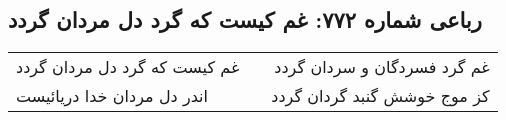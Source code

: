 \begin{center}
\section*{رباعی شماره ۷۷۲: غم کیست که گرد دل مردان گردد}
\label{sec:0772}
\begin{longtable}{l p{0.5cm} r}
غم کیست که گرد دل مردان گردد
&&
غم گرد فسردگان و سردان گردد
\\
اندر دل مردان خدا دریائیست
&&
کز موج خوشش گنبد گردان گردد
\\
\end{longtable}
\end{center}
